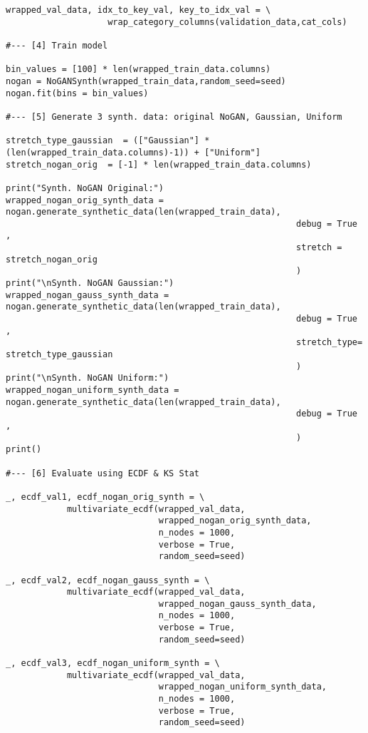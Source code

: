 \documentclass[oneside,10pt]{book}
\begin{document}
\begin{lstlisting}
wrapped_val_data, idx_to_key_val, key_to_idx_val = \
                    wrap_category_columns(validation_data,cat_cols)

#--- [4] Train model

bin_values = [100] * len(wrapped_train_data.columns)
nogan = NoGANSynth(wrapped_train_data,random_seed=seed)
nogan.fit(bins = bin_values)

#--- [5] Generate 3 synth. data: original NoGAN, Gaussian, Uniform

stretch_type_gaussian  = (["Gaussian"] * (len(wrapped_train_data.columns)-1)) + ["Uniform"]
stretch_nogan_orig  = [-1] * len(wrapped_train_data.columns)

print("Synth. NoGAN Original:")
wrapped_nogan_orig_synth_data = nogan.generate_synthetic_data(len(wrapped_train_data),
                                                         debug = True ,
                                                         stretch = stretch_nogan_orig
                                                         )
print("\nSynth. NoGAN Gaussian:")
wrapped_nogan_gauss_synth_data = nogan.generate_synthetic_data(len(wrapped_train_data),
                                                         debug = True ,
                                                         stretch_type= stretch_type_gaussian
                                                         )
print("\nSynth. NoGAN Uniform:")
wrapped_nogan_uniform_synth_data = nogan.generate_synthetic_data(len(wrapped_train_data),
                                                         debug = True ,
                                                         )
print()

#--- [6] Evaluate using ECDF & KS Stat

_, ecdf_val1, ecdf_nogan_orig_synth = \
            multivariate_ecdf(wrapped_val_data,
                              wrapped_nogan_orig_synth_data,
                              n_nodes = 1000,
                              verbose = True,
                              random_seed=seed)

_, ecdf_val2, ecdf_nogan_gauss_synth = \
            multivariate_ecdf(wrapped_val_data,
                              wrapped_nogan_gauss_synth_data,
                              n_nodes = 1000,
                              verbose = True,
                              random_seed=seed)

_, ecdf_val3, ecdf_nogan_uniform_synth = \
            multivariate_ecdf(wrapped_val_data,
                              wrapped_nogan_uniform_synth_data,
                              n_nodes = 1000,
                              verbose = True,
                              random_seed=seed)


\end{lstlisting}
\end{document}
